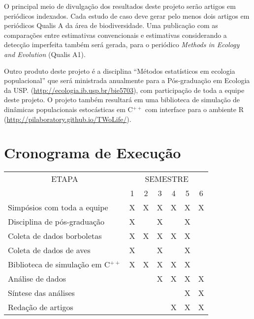 \documentclass[12pt, A4]{article}
\begin{document}
O principal meio de divulgação dos resultados deste projeto serão
artigos  em periódicos indexados. Cada estudo de caso
deve gerar pelo menos dois artigos em periódicos Qualis A da área de
biodiversidade. Uma publicação com as comparações entre estimativas
convencionais e estimativas considerando a detecção imperfeita também
será gerada, para o periódico \emph{Methods in Ecology and Evolution}
(Qualis A1).

Outro produto deste projeto é a disciplina ``Métodos estatísticos em
ecologia populacional'' que será ministrada anualmente para a
Pós-graduação em Ecologia da USP. (\url{http://ecologia.ib.usp.br/bie5703}),
com participação de toda a equipe deste projeto. O projeto também
resultará em uma biblioteca de simulação de dinâmicas populacionais
estocásticas em C$^{++}$ com interface para o ambiente R
(\url{http://pilaboratory.github.io/TWoLife/}).

\section{Cronograma de Execução}

  \begin{tabular}{|p{6cm}|c c c c c c|}
  \hline
  \multicolumn{1}{|c|}{ETAPA}&\multicolumn{6}{c|}{SEMESTRE}\\
  &1&2&3&4&5&6 \\
   \hline
   Simpósios com toda a equipe &X &X &X &X &X &X  \\
   Disciplina de pós-graduação &X & &X & &X &  \\
   Coleta de dados borboletas &X &X &X &X &X &  \\
   Coleta de dados de aves  &X & &X & &X &  \\
   Biblioteca de simulação em C$^{++}$ &X &X &X &X &X &  \\
   Análise de dados  & & &X &X &X &X  \\
   Síntese das análises  & & & & &X &X  \\
   Redação de artigos & & & & X&X &X  \\
   \hline
 \end{tabular}




\end{document}
